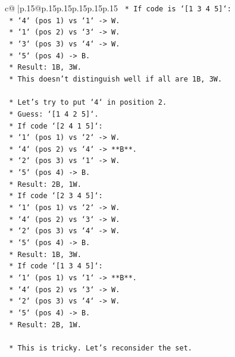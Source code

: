 \documentclass{article}
\begin{document}
{\begin{supertabular}{c@{$\;$}|p{.15\linewidth}@{}p{.15\linewidth}p{.15\linewidth}p{.15\linewidth}p{.15\linewidth}p{.15\linewidth}}
{{{\texttt{        *   If code is `{[}1 3 4 5{]}`:} \\
\texttt{            *   `4` (pos 1) vs `1` {-}> W.} \\
\texttt{            *   `1` (pos 2) vs `3` {-}> W.} \\
\texttt{            *   `3` (pos 3) vs `4` {-}> W.} \\
\texttt{            *   `5` (pos 4) {-}> B.} \\
\texttt{            *   Result: 1B, 3W.} \\
\texttt{    *   This doesn't distinguish well if all are 1B, 3W.} \\
\\ 
\texttt{    *   Let's try to put `4` in position 2.} \\
\texttt{    *   Guess: `{[}1 4 2 5{]}`.} \\
\texttt{        *   If code `{[}2 4 1 5{]}`:} \\
\texttt{            *   `1` (pos 1) vs `2` {-}> W.} \\
\texttt{            *   `4` (pos 2) vs `4` {-}> **B**.} \\
\texttt{            *   `2` (pos 3) vs `1` {-}> W.} \\
\texttt{            *   `5` (pos 4) {-}> B.} \\
\texttt{            *   Result: 2B, 1W.} \\
\texttt{        *   If code `{[}2 3 4 5{]}`:} \\
\texttt{            *   `1` (pos 1) vs `2` {-}> W.} \\
\texttt{            *   `4` (pos 2) vs `3` {-}> W.} \\
\texttt{            *   `2` (pos 3) vs `4` {-}> W.} \\
\texttt{            *   `5` (pos 4) {-}> B.} \\
\texttt{            *   Result: 1B, 3W.} \\
\texttt{        *   If code `{[}1 3 4 5{]}`:} \\
\texttt{            *   `1` (pos 1) vs `1` {-}> **B**.} \\
\texttt{            *   `4` (pos 2) vs `3` {-}> W.} \\
\texttt{            *   `2` (pos 3) vs `4` {-}> W.} \\
\texttt{            *   `5` (pos 4) {-}> B.} \\
\texttt{            *   Result: 2B, 1W.} \\
\\ 
\texttt{    *   This is tricky. Let's reconsider the set.} \\
}}}
\end{supertabular}}
\end{document}
